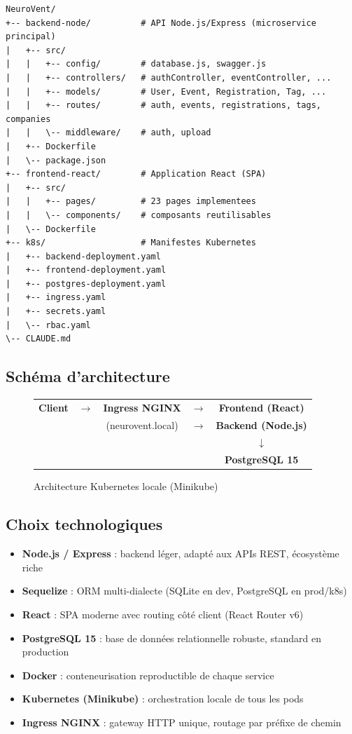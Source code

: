 \documentclass[12pt,a4paper]{article}
\begin{document}
\begin{lstlisting}[style=bash, caption={Structure du dépôt}]
NeuroVent/
+-- backend-node/          # API Node.js/Express (microservice principal)
|   +-- src/
|   |   +-- config/        # database.js, swagger.js
|   |   +-- controllers/   # authController, eventController, ...
|   |   +-- models/        # User, Event, Registration, Tag, ...
|   |   +-- routes/        # auth, events, registrations, tags, companies
|   |   \-- middleware/    # auth, upload
|   +-- Dockerfile
|   \-- package.json
+-- frontend-react/        # Application React (SPA)
|   +-- src/
|   |   +-- pages/         # 23 pages implementees
|   |   \-- components/    # composants reutilisables
|   \-- Dockerfile
+-- k8s/                   # Manifestes Kubernetes
|   +-- backend-deployment.yaml
|   +-- frontend-deployment.yaml
|   +-- postgres-deployment.yaml
|   +-- ingress.yaml
|   +-- secrets.yaml
|   \-- rbac.yaml
\-- CLAUDE.md
\end{lstlisting}

\subsection{Schéma d'architecture}

\begin{figure}[H]
  \centering
  \begin{tabular}{ccccc}
    \textbf{Client} & $\rightarrow$ & \textbf{Ingress NGINX} & $\rightarrow$ & \textbf{Frontend (React)} \\
    & & (neurovent.local) & $\rightarrow$ & \textbf{Backend (Node.js)} \\
    & & & & $\downarrow$ \\
    & & & & \textbf{PostgreSQL 15} \\
  \end{tabular}
  \caption{Architecture Kubernetes locale (Minikube)}
\end{figure}

\subsection{Choix technologiques}

\begin{itemize}
  \item \textbf{Node.js / Express} : backend léger, adapté aux APIs REST, écosystème riche
  \item \textbf{Sequelize} : ORM multi-dialecte (SQLite en dev, PostgreSQL en prod/k8s)
  \item \textbf{React} : SPA moderne avec routing côté client (React Router v6)
  \item \textbf{PostgreSQL 15} : base de données relationnelle robuste, standard en production
  \item \textbf{Docker} : conteneurisation reproductible de chaque service
  \item \textbf{Kubernetes (Minikube)} : orchestration locale de tous les pods
  \item \textbf{Ingress NGINX} : gateway HTTP unique, routage par préfixe de chemin
\end{itemize}
\end{document}
